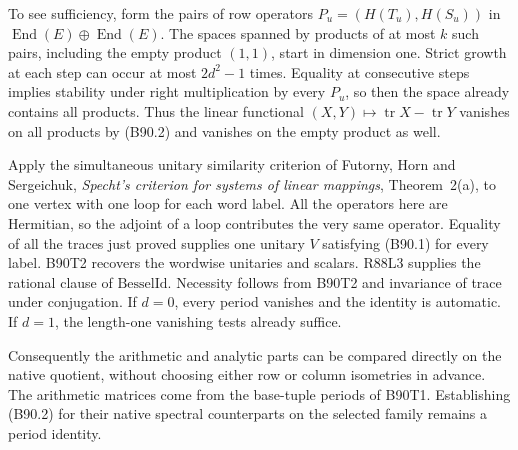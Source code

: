 To see sufficiency, form the pairs of row operators
$P_u=(H(T_u),H(S_u))$ in
$\operatorname{End}(E)\oplus\operatorname{End}(E)$. The spaces
spanned by products of at most $k$ such pairs, including the empty
product $(1,1)$, start in dimension one. Strict growth at each step
can occur at most $2d^2-1$ times. Equality at consecutive steps implies
stability under right multiplication by every $P_u$, so then the space
already contains all products. Thus the linear functional
$(X,Y)\mapsto\operatorname{tr} X-\operatorname{tr}Y$ vanishes on all
products by (B90.2) and vanishes on the empty product as well.

Apply the simultaneous unitary similarity criterion of Futorny,
Horn and Sergeichuk, \emph{Specht's criterion for systems of linear
mappings}, Theorem~2(a), to one vertex with one loop for each word
label. All the operators here are Hermitian, so the adjoint of a loop
contributes the very same operator. Equality of all the traces just
proved supplies one unitary $V$ satisfying (B90.1) for every label.
B90T2 recovers the wordwise unitaries and scalars. R88L3 supplies
the rational clause of $\mathrm{BesselId}$. Necessity follows from
B90T2 and invariance of trace under conjugation. If $d=0$, every
period vanishes and the identity is automatic. If $d=1$, the
length-one vanishing tests already suffice.

Consequently the arithmetic and analytic parts can be compared
directly on the native quotient, without choosing either row or column
isometries in advance. The arithmetic matrices come from the base-tuple
periods of B90T1. Establishing (B90.2) for their native spectral
counterparts on the selected family remains a period identity.
